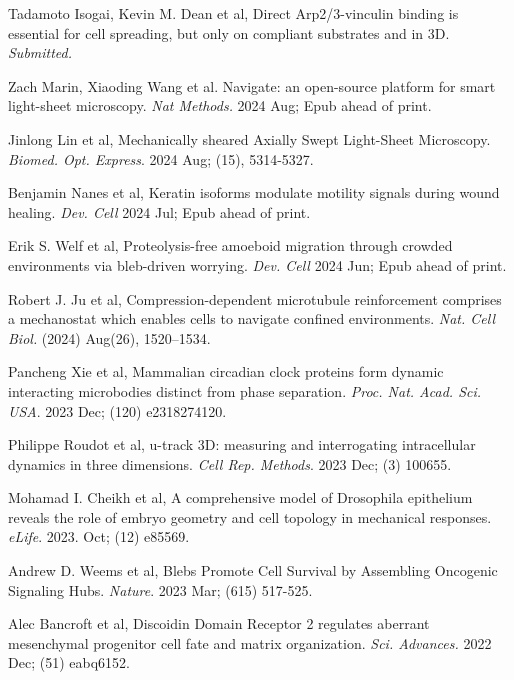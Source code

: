 
\begin{etaremune}

\item Tadamoto Isogai, Kevin M. Dean et al, Direct Arp2/3-vinculin binding is essential for cell spreading, but only on compliant substrates and in 3D. {\it Submitted.}  

\item Zach Marin, Xiaoding Wang et al. Navigate: an open-source platform for smart light-sheet microscopy. {\it Nat Methods.} 2024 Aug; Epub ahead of print.

\item Jinlong Lin et al, Mechanically sheared Axially Swept Light-Sheet Microscopy. {\it Biomed. Opt. Express}. 2024 Aug; (15), 5314-5327.

\item Benjamin Nanes et al, Keratin isoforms modulate motility signals during wound healing. {\it Dev. Cell} 2024 Jul; Epub ahead of print.

\item Erik S. Welf et al, Proteolysis-free amoeboid migration through crowded environments via bleb-driven worrying. {\it Dev. Cell} 2024 Jun; Epub ahead of print.

\item Robert J. Ju et al, Compression-dependent microtubule reinforcement comprises a mechanostat which enables cells to navigate confined environments. {\it Nat. Cell Biol.} (2024) Aug(26), 1520–1534.

\item Pancheng Xie et al, Mammalian circadian clock proteins form dynamic interacting microbodies distinct from phase separation. {\it Proc. Nat. Acad. Sci. USA}. 2023 Dec; (120) e2318274120.

\item Philippe Roudot et al, u-track 3D: measuring and interrogating intracellular dynamics in three dimensions.  {\it Cell Rep. Methods}. 2023 Dec; (3) 100655.

\item Mohamad I. Cheikh et al, A comprehensive model of Drosophila epithelium reveals the role of embryo geometry and cell topology in mechanical responses. {\it eLife}. 2023. Oct; (12) e85569.

\item Andrew D. Weems et al, Blebs Promote Cell Survival by Assembling Oncogenic Signaling Hubs. {\it Nature}. 2023 Mar; (615) 517-525.

\item Alec Bancroft et al, Discoidin Domain Receptor 2 regulates aberrant mesenchymal progenitor cell fate and matrix organization. {\it Sci. Advances.} 2022 Dec; (51) eabq6152.


\end{etaremune}
